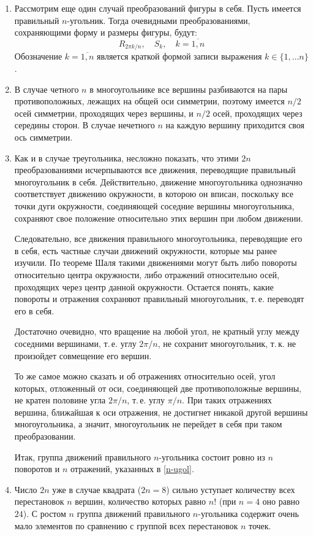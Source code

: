 \begin{enumerate}
\item Рассмотрим еще один случай преобразований фигуры в себя. Пусть имеется правильный $n$-угольник. Тогда очевидными преобразованиями, сохраняющими форму и размеры фигуры, будут:
\begin{equation}\label{n-ugol}
R_{2\pi k/n},\quad S_k,\quad k=\overline{1,n}
\end{equation}
Обозначение $k=\overline{1,n}$ является краткой формой записи выражения $k\in\{1,\dots n\}$.
\item В случае четного $n$ в многоугольнике все вершины разбиваются на пары противоположных, лежащих на общей оси симметрии, поэтому имеется $n/2$ осей симметрии, проходящих через вершины, и $n/2$ осей, проходящих через середины сторон. В случае нечетного $n$ на каждую вершину приходится своя ось симметрии.
\item Как и в случае треугольника, несложно показать, что этими $2n$ преобразованиями исчерпываются все движения, переводящие правильный многоугольник в себя. Действительно, движение многоугольника однозначно соответствует движению окружности, в которою он вписан, поскольку все точки дуги окружности, соединяющей соседние вершины многоугольника, сохраняют свое положение относительно этих вершин при любом движении.

Следовательно, все движения правильного многоугольника, переводящие его в себя, есть частные случаи движений окружности, которые мы ранее изучили. По теореме Шаля такими движениями могут быть либо повороты относительно центра окружности, либо отражений относительно осей, проходящих через центр данной окружности. Остается понять, какие повороты и отражения сохраняют правильный многоугольник, т.\,е. переводят его в себя.

Достаточно очевидно, что вращение на любой угол, не кратный углу между соседними вершинами, т.\,е. углу $2\pi/n$, не сохранит многоугольник, т.\,к. не произойдет совмещение его вершин.

То же самое можно сказать и об отражениях относительно осей, угол которых, отложенный от оси, соединяющей две противоположные вершины, не кратен половине угла $2\pi/n$, т.\,е. углу $\pi/n$. При таких отражениях вершина, ближайшая к оси отражения, не достигнет никакой другой вершины многоугольника, а значит, многоугольник не перейдет в себя при таком преобразовании.

Итак, группа движений правильного $n$-угольника состоит ровно из $n$ поворотов и $n$ отражений, указанных в \eqref{n-ugol}.

\item Число $2n$ уже в случае квадрата ($2n=8$) сильно уступает количеству всех перестановок $n$ вершин, количество которых равно $n!$ (при $n=4$ оно равно $24$). С ростом $n$ группа движений правильного $n$-угольника содержит очень мало элементов по сравнению с группой всех перестановок $n$ точек.
\end{enumerate}


